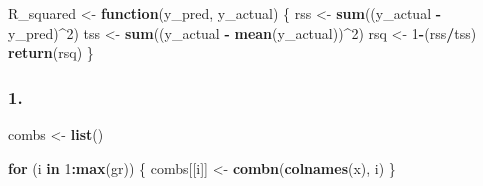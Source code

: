 \documentclass[
]{article}
\newenvironment{Shaded}{\begin{snugshade}}{\end{snugshade}}
\newcommand{\ControlFlowTok}[1]{\textcolor[rgb]{0.13,0.29,0.53}{\textbf{#1}}}
\newcommand{\DecValTok}[1]{\textcolor[rgb]{0.00,0.00,0.81}{#1}}
\newcommand{\FunctionTok}[1]{\textcolor[rgb]{0.13,0.29,0.53}{\textbf{#1}}}
\newcommand{\NormalTok}[1]{#1}
\newcommand{\OtherTok}[1]{\textcolor[rgb]{0.56,0.35,0.01}{#1}}
\newcommand{\SpecialCharTok}[1]{\textcolor[rgb]{0.81,0.36,0.00}{\textbf{#1}}}
\begin{document}
\begin{Shaded}
\begin{Highlighting}[]
\NormalTok{R\_squared }\OtherTok{\textless{}{-}} \ControlFlowTok{function}\NormalTok{(y\_pred, y\_actual) \{}
\NormalTok{  rss }\OtherTok{\textless{}{-}} \FunctionTok{sum}\NormalTok{((y\_actual }\SpecialCharTok{{-}}\NormalTok{ y\_pred)}\SpecialCharTok{\^{}}\DecValTok{2}\NormalTok{)}
\NormalTok{  tss }\OtherTok{\textless{}{-}} \FunctionTok{sum}\NormalTok{((y\_actual }\SpecialCharTok{{-}} \FunctionTok{mean}\NormalTok{(y\_actual))}\SpecialCharTok{\^{}}\DecValTok{2}\NormalTok{)}
\NormalTok{  rsq }\OtherTok{\textless{}{-}} \DecValTok{1}\SpecialCharTok{{-}}\NormalTok{(rss}\SpecialCharTok{/}\NormalTok{tss)}
  \FunctionTok{return}\NormalTok{(rsq)}
\NormalTok{\}}
\end{Highlighting}
\end{Shaded}

\subsubsection{1.}\label{section}

\begin{Shaded}
\begin{Highlighting}[]
\NormalTok{combs }\OtherTok{\textless{}{-}} \FunctionTok{list}\NormalTok{()}

\ControlFlowTok{for}\NormalTok{ (i }\ControlFlowTok{in} \DecValTok{1}\SpecialCharTok{:}\FunctionTok{max}\NormalTok{(gr)) \{}
\NormalTok{  combs[[i]] }\OtherTok{\textless{}{-}} \FunctionTok{combn}\NormalTok{(}\FunctionTok{colnames}\NormalTok{(x), i)}
\NormalTok{\}}
\end{Highlighting}
\end{Shaded}
\end{document}
